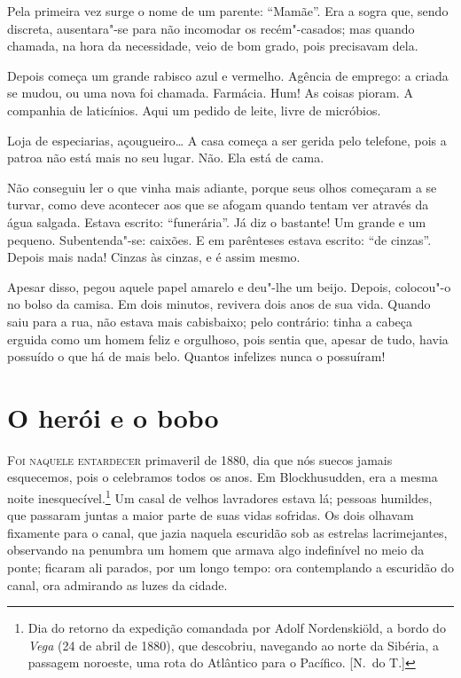 Pela primeira vez surge o nome de um parente: ``Mamãe''. Era a sogra que,
sendo discreta, ausentara"-se para não incomodar os recém"-casados;
mas quando chamada, na hora da necessidade, veio de bom grado, pois
precisavam dela. 

Depois começa um grande rabisco azul e vermelho. Agência de emprego: a
criada se mudou, ou uma nova foi chamada. Farmácia. Hum! As coisas
pioram. A companhia de laticínios. Aqui um pedido de leite, livre de
micróbios.

Loja de especiarias, açougueiro\ldots{} A casa começa a ser gerida pelo
telefone, pois a patroa não está mais no seu lugar. Não. Ela está de
cama.

Não conseguiu ler o que vinha mais adiante, porque seus olhos começaram
a se turvar, como deve acontecer aos que se afogam quando tentam ver
através da água salgada. Estava escrito: ``funerária''. Já diz o
bastante! Um grande e um pequeno. Subentenda"-se: caixões. E em
parênteses estava escrito: ``de cinzas''. Depois mais nada! 
Cinzas às cinzas, e é assim mesmo. 

Apesar disso, pegou aquele papel amarelo e deu"-lhe um beijo. Depois,
colocou"-o no bolso da camisa. Em dois minutos, revivera dois anos de
sua vida. Quando saiu para a rua, não estava mais cabisbaixo; pelo
contrário: tinha a cabeça erguida como um homem feliz e orgulhoso, pois
sentia que, apesar de tudo, havia possuído o que há de mais belo.
Quantos infelizes nunca o possuíram!

\chapter{O herói e o bobo}


\textsc{Foi naquele entardecer} primaveril de 1880, dia que nós suecos jamais
esquecemos, pois o celebramos todos os anos. Em Blockhusudden, era a
mesma noite inesquecível.\footnote{ Dia do retorno da expedição
comandada por Adolf Nordenskiöld, a bordo do \textit{Vega} (24 de abril de 1880),
que descobriu, navegando ao norte da Sibéria, a passagem
noroeste, uma rota do Atlântico para o Pacífico. [N.~do T.]} Um casal
de velhos lavradores estava lá; pessoas humildes, que passaram juntas a
maior parte de suas vidas sofridas. Os dois olhavam fixamente para o
canal, que jazia naquela escuridão sob as estrelas lacrimejantes,
observando na penumbra um homem que armava algo indefinível no meio da
ponte; ficaram ali parados, por um longo tempo: ora contemplando a
escuridão do canal, ora admirando as luzes da cidade.

